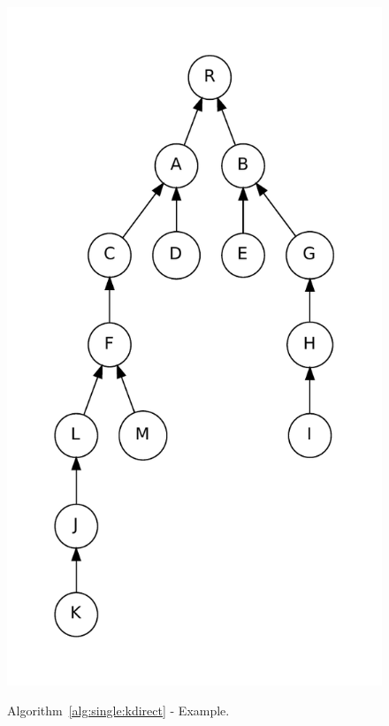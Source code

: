 \begin{figure}[t]
\begin{minipage}[b]{.5\linewidth}
    \includegraphics[scale=0.6]{figures/complementation/single-direct-sol.pdf}
    \label{fig:cgraph1:simple}
  \end{minipage}
  \caption[Single Inheritance Algorithm Example]{%
    Algorithm~\ref{alg:single:kdirect} - Example. }
  \label{fig:kdirect:ex}
\end{figure}




